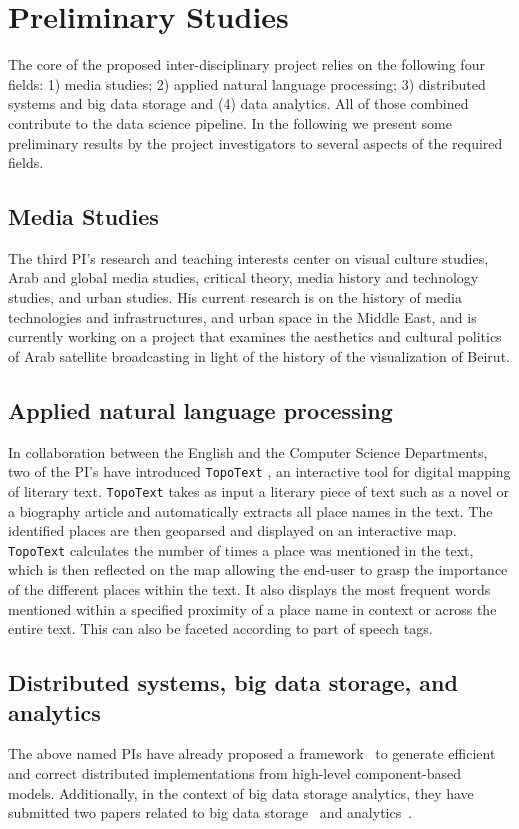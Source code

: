 \section{Preliminary Studies}

The core of the proposed inter-disciplinary project relies on the following four fields: 1) media studies; 2) applied natural language processing; 3) distributed systems and big data storage and (4) data analytics. All of those combined contribute to the data science pipeline. In the following we present some preliminary results by the project investigators to several aspects of the required fields.

\subsection{Media Studies}

The third PI's research and teaching interests center on visual culture studies, Arab and global media studies, critical theory, media history and technology studies, and urban studies. His current research is on the history of media technologies and infrastructures, and urban space in the Middle East, and is currently working on a project that examines the aesthetics and cultural politics of Arab satellite broadcasting in light of the history of the visualization of Beirut.

\subsection{Applied natural language processing}
In collaboration between the English and the Computer Science Departments, two of the PI's have introduced \texttt{TopoText} \cite{topotext1,topotext2}, an interactive tool for digital mapping of literary text. \texttt{TopoText} takes as input a literary piece of text such as a novel or a biography article and automatically extracts all place names in the text. The identified places are then geoparsed and displayed on an interactive map. \texttt{TopoText} calculates the number of times a place was mentioned in the text, which is then reflected on the map allowing the end-user to grasp the importance of the different places within the text. It also displays the most frequent words mentioned within a specified proximity of a place name in context or across the entire text. This can also be faceted according to part of speech tags.

\subsection{Distributed systems, big data storage, and analytics}
The above named PIs have already proposed a framework~\cite{bip-distributed} to generate efficient and correct distributed implementations from high-level component-based models. Additionally, in the context of big data storage analytics, they have submitted two papers related to big data storage~\cite{hbase-dynamique} and analytics~\cite{spark-cbs}. 
%

